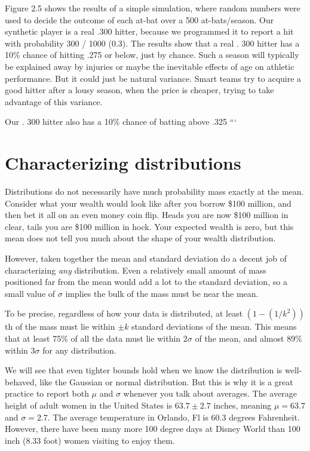 \documentclass[10pt]{article}
\begin{document}
Figure 2.5 shows the results of a simple simulation, where random numbers were used to decide the outcome of each at-bat over a 500 at-bats/season. Our synthetic player is a real .300 hitter, because we programmed it to report a hit with probability 300 / 1000 (0.3). The results show that a real . 300 hitter has a 10\% chance of hitting .275 or below, just by chance. Such a season will typically be explained away by injuries or maybe the inevitable effects of age on athletic performance. But it could just be natural variance. Smart teams try to acquire a good hitter after a lousy season, when the price is cheaper, trying to take advantage of this variance.

Our . 300 hitter also has a 10\% chance of batting above .325
```
\

\section{Characterizing distributions}
Distributions do not necessarily have much probability mass exactly at the mean. Consider what your wealth would look like after you borrow \$100 million, and then bet it all on an even money coin flip. Heads you are now \$100 million in clear, tails you are \$100 million in hock. Your expected wealth is zero, but this mean does not tell you much about the shape of your wealth distribution.

However, taken together the mean and standard deviation do a decent job of characterizing \textit{any} distribution. Even a relatively small amount of mass positioned far from the mean would add a lot to the standard deviation, so a small value of \(\sigma\) implies the bulk of the mass must be near the mean.

To be precise, regardless of how your data is distributed, at least \((1-(1/k^{2}))\)th of the mass must lie within \(\pm k\) standard deviations of the mean. This means that at least 75\% of all the data must lie within \(2\sigma\) of the mean, and almost 89\% within \(3\sigma\) for any distribution.

We will see that even tighter bounds hold when we know the distribution is well-behaved, like the Gaussian or normal distribution. But this is why it is a great practice to report both \(\mu\) and \(\sigma\) whenever you talk about averages. The average height of adult women in the United States is \(63.7 \pm 2.7\) inches, meaning \(\mu=63.7\) and \(\sigma=2.7\). The average temperature in Orlando, Fl is 60.3 degrees Fahrenheit. However, there have been many more 100 degree days at Disney World than 100 inch (8.33 foot) women visiting to enjoy them.
\end{document}
